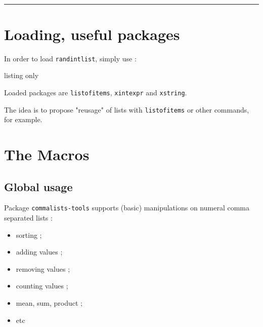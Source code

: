 \documentclass[11pt,a4paper]{ltxdoc}
\begin{document}
\vfill~

%

%

\hrule

\vspace*{5mm}

\pagebreak


\hypertarget{matoc}{}

\tableofcontents

\vspace*{5mm}


\pagebreak

\section{Loading, useful packages}

In order to load \texttt{randintlist}, simply use :

\begin{DemoCode}{listing only}
\usepackage{commalists-tools}
\end{DemoCode}

Loaded packages are \texttt{listofitems}, \texttt{xintexpr} and \texttt{xstring}.

\smallskip

The idea is to propose "reusage" of lists with \texttt{listofitems} or other commands, for example.

\section{The Macros}

\subsection{Global usage}

Package \texttt{commalists-tools} supports (basic) manipulations on numeral comma separated lists :

\begin{itemize}
	\item sorting ;
	\item adding values ;
	\item removing values ;
	\item counting values ;
	\item mean, sum, product ;
	\item etc
\end{itemize}
\end{document}
